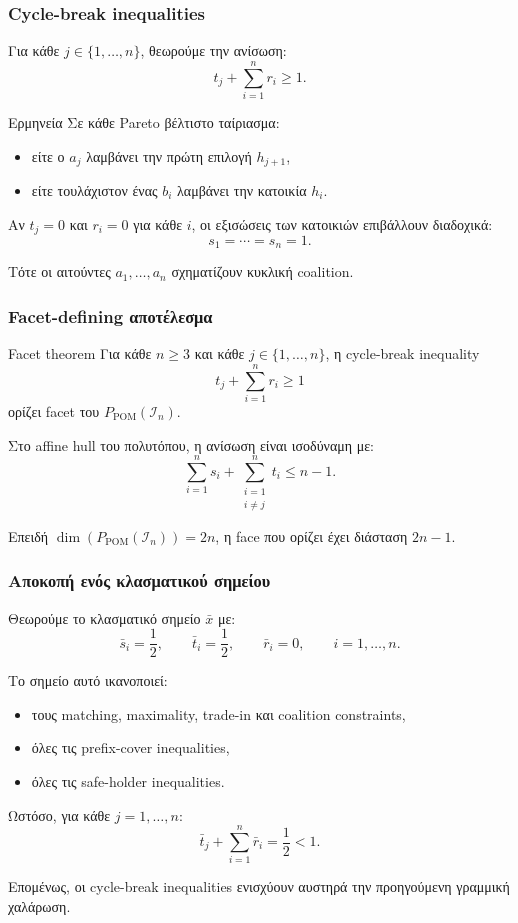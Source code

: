 \documentclass{beamer}
\begin{document}
	\begin{frame}
		\frametitle{Cycle-break inequalities}
		
		Για κάθε $j\in\{1,\ldots,n\}$, θεωρούμε την ανίσωση:
		\[
		t_j+\sum_{i=1}^{n}r_i\geq 1.
		\]
		
		\begin{block}{Ερμηνεία}
			Σε κάθε Pareto βέλτιστο ταίριασμα:
			
			\begin{itemize}
				\item είτε ο $a_j$ λαμβάνει την πρώτη επιλογή $h_{j+1}$,
				\item είτε τουλάχιστον ένας $b_i$ λαμβάνει την κατοικία $h_i$.
			\end{itemize}
		\end{block}
		
		Αν $t_j=0$ και $r_i=0$ για κάθε $i$, οι εξισώσεις των κατοικιών επιβάλλουν διαδοχικά:
		\[
		s_1=\cdots=s_n=1.
		\]
		
		Τότε οι αιτούντες $a_1,\ldots,a_n$ σχηματίζουν κυκλική coalition.
	\end{frame}
	
	\begin{frame}
		\frametitle{Facet-defining αποτέλεσμα}
		
		\begin{block}{Facet theorem}
			Για κάθε $n\geq 3$ και κάθε $j\in\{1,\ldots,n\}$, η cycle-break inequality
			\[
			t_j+\sum_{i=1}^{n}r_i\geq 1
			\]
			ορίζει facet του $P_{\mathrm{POM}}(\mathcal I_n)$.
		\end{block}
		
		Στο affine hull του πολυτόπου, η ανίσωση είναι ισοδύναμη με:
		\[
		\sum_{i=1}^{n}s_i
		+
		\sum_{\substack{i=1\\i\neq j}}^{n}t_i
		\leq n-1.
		\]
		
		Επειδή $\dim(P_{\mathrm{POM}}(\mathcal I_n))=2n$, η face που ορίζει έχει διάσταση $2n-1$.
	\end{frame}
	
	\begin{frame}
		\frametitle{Αποκοπή ενός κλασματικού σημείου}
		
		Θεωρούμε το κλασματικό σημείο $\bar{x}$ με:
		\[
		\bar{s}_i=\frac{1}{2},
		\qquad
		\bar{t}_i=\frac{1}{2},
		\qquad
		\bar{r}_i=0,
		\qquad i=1,\ldots,n.
		\]
		
		Το σημείο αυτό ικανοποιεί:
		
		\begin{itemize}
			\item τους matching, maximality, trade-in και coalition constraints,
			\item όλες τις prefix-cover inequalities,
			\item όλες τις safe-holder inequalities.
		\end{itemize}
		
		Ωστόσο, για κάθε $j=1,\ldots,n$:
		\[
		\bar{t}_j+\sum_{i=1}^{n}\bar{r}_i
		=
		\frac{1}{2}
		<1.
		\]
		
		Επομένως, οι cycle-break inequalities ενισχύουν αυστηρά την προηγούμενη γραμμική χαλάρωση.
	\end{frame}
	
\end{document}
